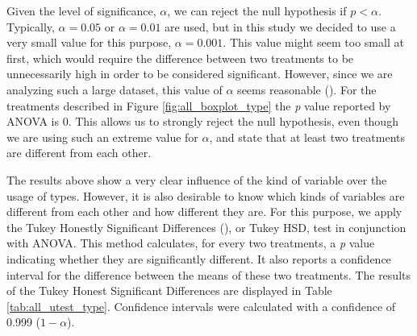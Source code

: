 \documentclass[msc]{ppgccufmg}
\begin{document}
Given the level of significance, $\alpha$, we can reject the null hypothesis if $p < \alpha$.
Typically, $\alpha=0.05$ or $\alpha=0.01$ are used, but in this study  we decided to use a very small value for this purpose, $\alpha=0.001$.
This value might seem too small at first, which would require the difference between two treatments to be unnecessarily high in order to be considered significant.
However, since we are analyzing such a large dataset, this value of $\alpha$ seems reasonable (\cite{labovitz68}).
For the treatments described in Figure \ref{fig:all_boxplot_type} the \emph{p} value reported by ANOVA is 0. 
This allows us to strongly reject the null hypothesis, even though we are using such an extreme value for $\alpha$, and state that at least two treatments are different from each other.


The results above show a very clear influence of the kind of variable over the usage of types.
However, it is also desirable to know which kinds of variables are different from each other and how different they are.
For this purpose, we apply the Tukey Honestly Significant Differences (\cite{kirk1995}), or Tukey HSD, test in conjunction with ANOVA.
This method calculates, for every two treatments, a \emph{p} value indicating whether they are significantly different.
It also reports a confidence interval for the difference between the means of these two treatments.
The results of the Tukey Honest Significant Differences are displayed in Table \ref{tab:all_utest_type}.
Confidence intervals were calculated with a confidence of 0.999 ($1-\alpha$).


\end{document}
